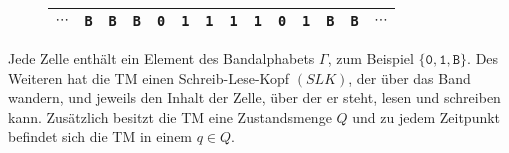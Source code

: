 \documentclass{scrartcl}%
\begin{document}
    \begin{figure}[htb]
        \centering
        \begin{tabular}{C{1em}|C{1em}|C{1em}|C{1em}|C{1em}|C{1em}|C{1em}|C{1em}|C{1em}|C{1em}|C{1em}|C{1em}|C{1em}|C{1em}}
            \hline
            $\cdots$ & \texttt{B} & \texttt{B} & \texttt{B} & \texttt{0} & \texttt{1} & \texttt{1} & \texttt{1} & \texttt{1} & \texttt{0} & \texttt{1} & \texttt{B} & \texttt{B} & $\cdots$\\
            \hline
        \end{tabular}
    \end{figure}

    Jede Zelle enthält ein Element des Bandalphabets $\Gamma$, zum Beispiel $\{\texttt{0},\texttt{1}, \texttt{B}\}$.
    Des Weiteren hat die TM einen Schreib-Lese-Kopf $(SLK)$, der über das Band wandern,
    und jeweils den Inhalt der Zelle, über der er steht, lesen und schreiben kann.
    Zusätzlich besitzt die TM eine Zustandsmenge $Q$ und zu jedem Zeitpunkt befindet sich die TM in einem $q \in Q$.
\end{document}
